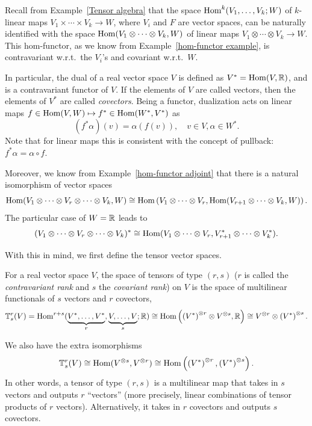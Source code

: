 Recall from Example~\ref{Tensor algebra} that the space $\operatorname{Hom}^k(V_1,\ldots,V_k;W)$ of $k$-linear maps $V_1\times \cdots\times V_k\to W$, where $V_i$ and $F$ are vector spaces, can be naturally identified with the space $\operatorname{Hom}(V_1\otimes\cdots\otimes V_k,W)$ of linear maps $V_1\otimes \cdots\otimes V_k\to W$. This hom-functor, as we know from Example~\ref{hom-functor example}, is contravariant w.r.t.\ the $V_i$'s and covariant w.r.t.\ $W$. 

In particular, the dual of a real vector space $V$ is defined as $V^\ast=\operatorname{Hom}(V,\mathbb{R} )$, and is a contravariant functor of $V$. If the elements of $V$ are called vectors, then the elements of $V^\ast$ are called \emph{covectors}. Being a functor, dualization acts on linear maps $f\in\operatorname{Hom}(V,W)\mapsto f^\ast\in \operatorname{Hom}(W^\ast,V^\ast)$ as 
\[(f^\ast\alpha)(v)=\alpha(f(v)), \quad v\in V, \alpha\in W^\ast.\] 
Note that for linear maps this is consistent with the concept of pullback: $f^\ast\alpha=\alpha\circ f$.

Moreover, we know from Example~\ref{hom-functor adjoint} that there is a natural isomorphism of vector spaces
\[
\operatorname{Hom}(V_1\otimes\cdots\otimes V_r\otimes\cdots\otimes V_k,W)\cong\operatorname{Hom}\left(V_1\otimes\cdots\otimes V_r,\operatorname{Hom}(V_{r+1}\otimes\cdots\otimes V_k,W)\right).
\]
The particular case of $W=\mathbb{R} $ leads to 
\[
(V_1\otimes\cdots\otimes V_r\otimes\cdots\otimes V_k)^\ast\cong\operatorname{Hom}(V_1\otimes\cdots\otimes V_r,V_{r+1}^\ast\otimes\cdots\otimes V_k^\ast).
\]

With this in mind, we first define the tensor vector spaces.

\begin{defn}[Tensors]
    For a real vector space $V$, the space of tensors of type $(r,s)$ ($r$ is called the \emph{contravariant rank} and $s$ the \emph{covariant rank}) on $V$ is the space of multilinear functionals of $s$ vectors and $r$ covectors, \[\mathbb{T}^r_s(V)=\operatorname{Hom}^{r+s}(\underbrace{V^\ast,\ldots,V^\ast}_{r},\underbrace{V,\ldots,V}_s;\mathbb{R} )\cong\operatorname{Hom} \left(\left(V^\ast\right)^{\otimes r}\otimes V^{\otimes s},\mathbb{R} \right)\cong V^{\otimes r}\otimes \left(V^\ast\right)^{\otimes s}.\]
\end{defn}

We also have the extra isomorphisms
\[
\mathbb{T}^r_s(V)\cong \operatorname{Hom}(V^{\otimes s},V^{\otimes r})\cong \operatorname{Hom}\left(\left(V^\ast\right)^{\otimes r},\left(V^\ast\right)^{\otimes s}\right).
\]
In other words, a tensor of type $(r,s)$ is a multilinear map that takes in $s$ vectors and outputs $r$ ``vectors'' (more precisely, linear combinations of tensor products of $r$ vectors). Alternatively, it takes in $r$ covectors and outputs $s$ covectors.

